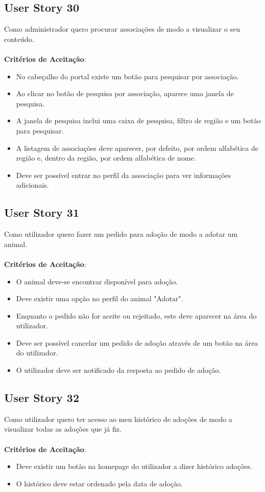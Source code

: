 \documentclass[a4paper,11pt]{article}
\begin{document}
\subsection*{User Story 30}
Como administrador quero procurar associações de modo a visualizar o seu conteúdo.\\\\
\textbf{Critérios de Aceitação}:
\begin{itemize}
  \item No cabeçalho do portal existe um botão para pesquisar por associação.
  \item Ao clicar no botão de pesquisa por associação, aparece uma janela de pesquisa.
  \item A janela de pesquisa inclui uma caixa de pesquisa, filtro de região e um botão para pesquisar.
  \item A listagem de associações deve aparecer, por defeito, por ordem alfabética de região e, dentro da região, por ordem alfabética de nome.
  \item Deve ser possível entrar no perfil da associação para ver informações adicionais.
\end{itemize}

\subsection*{User Story 31}
Como utilizador quero fazer um pedido para adoção de modo a adotar um animal.\\\\
\textbf{Critérios de Aceitação}:
\begin{itemize}
  \item O animal deve-se encontrar disponível para adoção.
  \item Deve existir uma opção no perfil do animal "Adotar".
  \item Enquanto o pedido não for aceite ou rejeitado, este deve aparecer na área do utilizador.
  \item Deve ser possível cancelar um pedido de adoção através de um botão na área do utilizador.
  \item O utilizador deve ser notificado da resposta ao pedido de adoção.
\end{itemize}

\subsection*{User Story 32}
Como utilizador quero ter acesso ao meu histórico de adoções de modo a visualizar todas as adoções que já fiz.\\\\
\textbf{Critérios de Aceitação}:
\begin{itemize}
  \item Deve existir um botão na homepage do utilizador a dizer histórico adoções.
  \item O histórico deve estar ordenado pela data de adoção.
\end{itemize}
\end{document}
